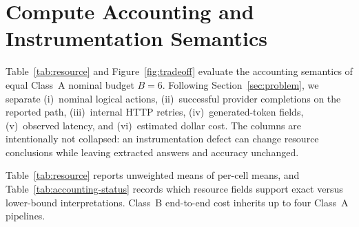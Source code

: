 \section{Compute Accounting and Instrumentation Semantics}
\label{sec:compute}

Table~\ref{tab:resource} and Figure~\ref{fig:tradeoff} evaluate the accounting semantics of equal
Class~A nominal budget $B{=}6$. Following Section~\ref{sec:problem}, we separate (i)~nominal
logical actions, (ii)~successful provider completions on the reported path, (iii)~internal HTTP
retries, (iv)~generated-token fields, (v)~observed latency, and (vi)~estimated dollar cost. The
columns are intentionally not collapsed: an instrumentation defect can change resource conclusions
while leaving extracted answers and accuracy unchanged.

\begin{table}[tbp]
\centering
\footnotesize
\setlength{\tabcolsep}{4pt}
\caption{Mean realized resources per evaluated Class~A policy across $15$ cells (nominal $B{=}6$).
Class~B pool cost inherits up to four Class~A pipelines (Table~\ref{tab:main-matrix}). USD uses a
2026-07-16 pricing snapshot. Frontier token/cost reconstruction status is documented in the table
note.}
\label{tab:resource}

\end{table}

\begin{table}[tbp]
\centering
\footnotesize
\setlength{\tabcolsep}{3pt}
\caption{Accounting status for resource fields used in Table~\ref{tab:resource} and
Figure~\ref{fig:tradeoff}. The status labels distinguish exact, reconstructed, incomplete, and
lower-bound quantities; no missing token, retry, or dollar fields are imputed.}
\label{tab:accounting-status}

\end{table}

Table~\ref{tab:resource} reports unweighted means of per-cell means, and
Table~\ref{tab:accounting-status} records which resource fields support exact versus lower-bound
interpretations. Class~B end-to-end cost inherits up to four Class~A pipelines.

